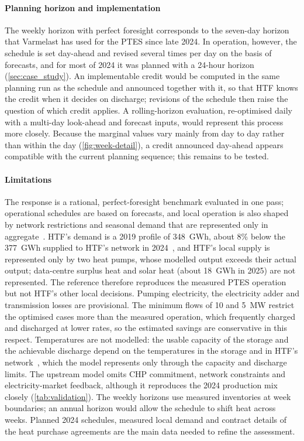 \paragraph{Planning horizon and implementation}
The weekly horizon with perfect foresight corresponds to the seven-day horizon that Varmelast has used for the PTES since late 2024. In operation, however, the schedule is set day-ahead and revised several times per day on the basis of forecasts, and for most of 2024 it was planned with a 24-hour horizon (\cref{sec:case_study}). An implementable credit would be computed in the same planning run as the schedule and announced together with it, so that HTF knows the credit when it decides on discharge; revisions of the schedule then raise the question of which credit applies. A rolling-horizon evaluation, re-optimised daily with a multi-day look-ahead and forecast inputs, would represent this process more closely. Because the marginal values vary mainly from day to day rather than within the day (\cref{fig:week-detail}), a credit announced day-ahead appears compatible with the current planning sequence; this remains to be tested.

\paragraph{Limitations}
The response is a rational, perfect-foresight benchmark evaluated in one pass; operational schedules are based on forecasts, and local operation is also shaped by network restrictions and seasonal demand that are represented only in aggregate~\cite{sifnaios2025performance}. HTF's demand is a 2019 profile of 348~GWh, about 8\% below the 377~GWh supplied to HTF's network in 2024~\cite{htf_annual_report_2025}, and HTF's local supply is represented only by two heat pumps, whose modelled output exceeds their actual output; data-centre surplus heat and solar heat (about 18~GWh in 2025) are not represented. The reference therefore reproduces the measured PTES operation but not HTF's other local decisions. Pumping electricity, the electricity adder and transmission losses are provisional. The minimum flows of 10 and 5~MW restrict the optimised cases more than the measured operation, which frequently charged and discharged at lower rates, so the estimated savings are conservative in this respect. Temperatures are not modelled: the usable capacity of the storage and the achievable discharge depend on the temperatures in the storage and in HTF's network~\cite{schauss2026mind}, which the model represents only through the capacity and discharge limits. The upstream model omits CHP commitment, network constraints and electricity-market feedback, although it reproduces the 2024 production mix closely (\cref{tab:validation}). The weekly horizons use measured inventories at week boundaries; an annual horizon would allow the schedule to shift heat across weeks. Planned 2024 schedules, measured local demand and contract details of the heat purchase agreements are the main data needed to refine the assessment.

